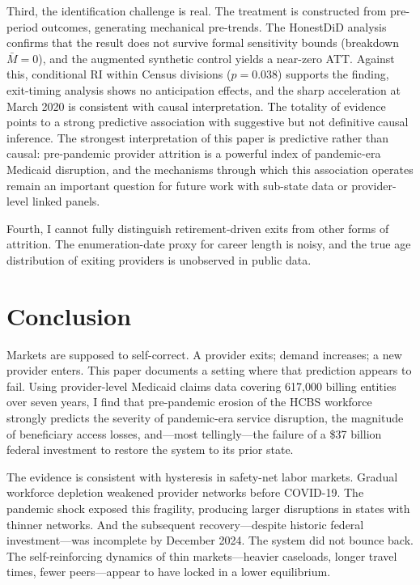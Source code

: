 \documentclass[12pt]{article}
\begin{document}
Third, the identification challenge is real. The treatment is constructed from pre-period outcomes, generating mechanical pre-trends. The HonestDiD analysis confirms that the result does not survive formal sensitivity bounds (breakdown $\bar{M} = 0$), and the augmented synthetic control yields a near-zero ATT. Against this, conditional RI within Census divisions ($p = 0.038$) supports the finding, exit-timing analysis shows no anticipation effects, and the sharp acceleration at March 2020 is consistent with causal interpretation. The totality of evidence points to a strong predictive association with suggestive but not definitive causal inference. The strongest interpretation of this paper is predictive rather than causal: pre-pandemic provider attrition is a powerful index of pandemic-era Medicaid disruption, and the mechanisms through which this association operates remain an important question for future work with sub-state data or provider-level linked panels.

Fourth, I cannot fully distinguish retirement-driven exits from other forms of attrition. The enumeration-date proxy for career length is noisy, and the true age distribution of exiting providers is unobserved in public data.


\section{Conclusion}

Markets are supposed to self-correct. A provider exits; demand increases; a new provider enters. This paper documents a setting where that prediction appears to fail. Using provider-level Medicaid claims data covering 617,000 billing entities over seven years, I find that pre-pandemic erosion of the HCBS workforce strongly predicts the severity of pandemic-era service disruption, the magnitude of beneficiary access losses, and---most tellingly---the failure of a \$37 billion federal investment to restore the system to its prior state.

The evidence is consistent with hysteresis in safety-net labor markets. Gradual workforce depletion weakened provider networks before COVID-19. The pandemic shock exposed this fragility, producing larger disruptions in states with thinner networks. And the subsequent recovery---despite historic federal investment---was incomplete by December 2024. The system did not bounce back. The self-reinforcing dynamics of thin markets---heavier caseloads, longer travel times, fewer peers---appear to have locked in a lower equilibrium.
\end{document}
